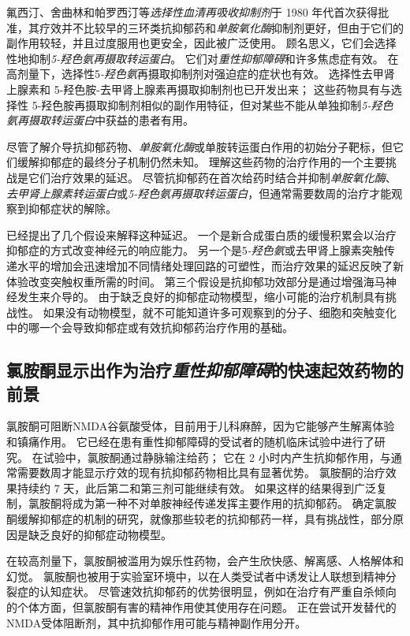 氟西汀、舍曲林和帕罗西汀等\textit{选择性血清再吸收抑制剂}于 1980 年代首次获得批准，其疗效并不比较早的三环类抗抑郁药和\textit{单胺氧化酶}抑制剂更好，但由于它们的副作用较轻，并且过度服用也更安全，因此被广泛使用。
顾名思义，它们会选择性地抑制\textit{5-羟色氨再摄取转运蛋白}。
它们对\textit{重性抑郁障碍}和许多焦虑症有效。
在高剂量下，选择性5\textit{-羟色氨}再摄取抑制剂对强迫症的症状也有效。
选择性去甲肾上腺素和 5-羟色胺-去甲肾上腺素再摄取抑制剂也已开发出来；
这些药物具有与选择性 5-羟色胺再摄取抑制剂相似的副作用特征，但对某些不能从单独抑制\textit{5-羟色氨再摄取转运蛋白}中获益的患者有用。


尽管了解介导抗抑郁药物、\textit{单胺氧化酶}或单胺转运蛋白作用的初始分子靶标，但它们缓解抑郁症的最终分子机制仍然未知。
理解这些药物的治疗作用的一个主要挑战是它们治疗效果的延迟。
尽管抗抑郁药在首次给药时结合并抑制\textit{单胺氧化酶}、\textit{去甲肾上腺素转运蛋白}或\textit{5-羟色氨再摄取转运蛋白}，但通常需要数周的治疗才能观察到抑郁症状的解除。


已经提出了几个假设来解释这种延迟。
一个是新合成蛋白质的缓慢积累会以治疗抑郁症的方式改变神经元的响应能力。
另一个是5\textit{-羟色氨}或去甲肾上腺素突触传递水平的增加会迅速增加不同情绪处理回路的可塑性，而治疗效果的延迟反映了新体验改变突触权重所需的时间。
第三个假设是抗抑郁功效部分是通过增强海马神经发生来介导的。
由于缺乏良好的抑郁症动物模型，缩小可能的治疗机制具有挑战性。
如果没有动物模型，就不可能知道许多可观察到的分子、细胞和突触变化中的哪一个会导致抑郁症或有效抗抑郁药治疗作用的基础。



\subsection{氯胺酮显示出作为治疗\textit{重性抑郁障碍}的快速起效药物的前景}

氯胺酮可阻断NMDA谷氨酸受体，目前用于儿科麻醉，因为它能够产生解离体验和镇痛作用。
它已经在患有重性抑郁障碍的受试者的随机临床试验中进行了研究。
在试验中，氯胺酮通过静脉输注给药；
它在 2 小时内产生抗抑郁作用，与通常需要数周才能显示疗效的现有抗抑郁药物相比具有显著优势。
氯胺酮的治疗效果持续约 7 天，此后第二和第三剂可能继续有效。
如果这样的结果得到广泛复制，氯胺酮将成为第一种不对单胺神经传递发挥主要作用的抗抑郁药。
确定氯胺酮缓解抑郁症的机制的研究，就像那些较老的抗抑郁药一样，具有挑战性，部分原因是缺乏良好的抑郁症动物模型。


在较高剂量下，氯胺酮被滥用为娱乐性药物，会产生欣快感、解离感、人格解体和幻觉。
氯胺酮也被用于实验室环境中，以在人类受试者中诱发让人联想到精神分裂症的认知症状。
尽管速效抗抑郁药的优势很明显，例如在治疗有严重自杀倾向的个体方面，但氯胺酮有害的精神作用使其使用存在问题。
正在尝试开发替代的NMDA受体阻断剂，其中抗抑郁作用可能与精神副作用分开。



